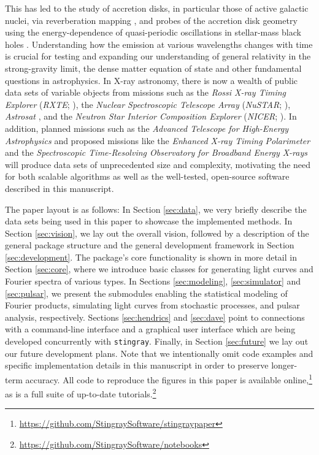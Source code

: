 \documentclass[twocolumn]{aastex62}
\newcommand{\project}[1]{\textsl{#1}\xspace}
\newcommand{\nustar}{\project{NuSTAR}\xspace}
\newcommand{\stingray}{\texttt{stingray}\xspace}
\begin{document}
This has led to the study of accretion disks, in particular those of active galactic nuclei, via reverberation mapping \citep[e.g.,][]{blandford1982,Bentz2016}, and probes of the accretion disk geometry using the energy-dependence of quasi-periodic oscillations in stellar-mass black holes \citep[e.g.,][]{ingram2015,stevensuttley2016}. 
Understanding how the emission at various wavelengths changes with time is crucial for testing and expanding our understanding of general relativity in the strong-gravity limit, the dense matter equation of state and other fundamental questions in astrophysics.
In X-ray astronomy, there is now a wealth of public data sets of variable objects from missions such as the \textit{Rossi X-ray Timing Explorer}  (\textit{RXTE}; \citealt{Bradtetal93}), the \textit{Nuclear Spectroscopic Telescope Array} (\nustar; \citealt{nustar13}), \textit{Astrosat} \citep{singh2014}, and the \textit{Neutron Star Interior Composition Explorer} (\textit{NICER}; \citealt{gendreau2016}). 
In addition, planned missions such as the \textit{Advanced Telescope for High-Energy Astrophysics} \citep[\textit{Athena};][]{athenaXIFU} and proposed missions like the \textit{Enhanced X-ray Timing Polarimeter} \citep[\textit{eXTP};][]{extp16} and the \textit{Spectroscopic Time-Resolving Observatory for Broadband Energy X-rays} \citep[\textit{STROBE-X};][]{strobex18} will produce data sets of unprecedented size and complexity, motivating the need for both scalable algorithms as well as the well-tested, open-source software described in this manuscript.

The paper layout is as follows: 
In Section \ref{sec:data}, we very briefly describe the data sets being used in this paper to showcase the implemented methods. 
In Section \ref{sec:vision}, we lay out the overall vision, followed by a description of the general package structure and the general development framework in Section \ref{sec:development}. 
The package's core functionality is shown in more detail in Section \ref{sec:core}, where we introduce basic classes for generating light curves and Fourier spectra of various types.
In Sections \ref{sec:modeling}, \ref{sec:simulator} and \ref{sec:pulsar}, we present the submodules enabling the statistical modeling of Fourier products, simulating light curves from stochastic processes, and pulsar analysis, respectively.
Sections \ref{sec:hendrics} and \ref{sec:dave} point to connections with a command-line interface and a graphical user interface which are being developed concurrently with \stingray. 
Finally, in Section \ref{sec:future} we lay out our future development plans. 
Note that we intentionally omit code examples and specific implementation details in this manuscript in order to preserve longer-term accuracy. 
All code to reproduce the figures in this paper is available online,\footnote{\url{https://github.com/StingraySoftware/stingraypaper}} as is a full suite of up-to-date tutorials.\footnote{\label{foot:nb}\url{https://github.com/StingraySoftware/notebooks}}
\end{document}

